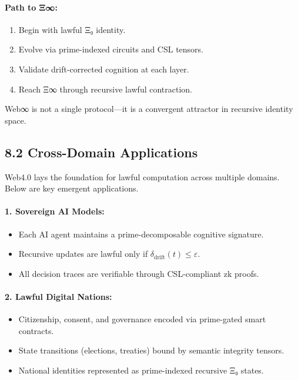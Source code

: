 \documentclass[12]{amsart}
\theoremstyle{plain}
\begin{document}
\paragraph{Path to Ξ∞:}
\begin{enumerate}
  \item Begin with lawful Ξ₀ identity.
  \item Evolve via prime-indexed circuits and CSL tensors.
  \item Validate drift-corrected cognition at each layer.
  \item Reach Ξ∞ through recursive lawful contraction.
\end{enumerate}

Web∞ is not a single protocol—it is a convergent attractor in recursive identity space.

\subsection{8.2 Cross-Domain Applications}
\label{subsec:cross_domain}

Web4.0 lays the foundation for lawful computation across multiple domains. Below are key emergent applications.

\paragraph{1. Sovereign AI Models:}
\begin{itemize}
  \item Each AI agent maintains a prime-decomposable cognitive signature.
  \item Recursive updates are lawful only if $\delta_{\text{drift}}(t) \leq \varepsilon$.
  \item All decision traces are verifiable through CSL-compliant zk proofs.
\end{itemize}

\paragraph{2. Lawful Digital Nations:}
\begin{itemize}
  \item Citizenship, consent, and governance encoded via prime-gated smart contracts.
  \item State transitions (elections, treaties) bound by semantic integrity tensors.
  \item National identities represented as prime-indexed recursive Ξ₀ states.
\end{itemize}
\end{document}
